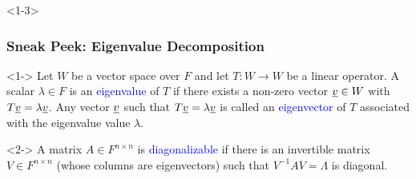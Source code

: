 \documentclass[10pt,english,aspectratio=169]{beamer}
\begin{document}
\begin{frame}<1-3> \frametitle{Sneak Peek: Eigenvalue Decomposition}

\begin{definition}<1->
Let $W$ be a vector space over $F$ and let $T\colon W \to W$ be a linear operator.
A scalar $\lambda \in F$ is an \textcolor{blue}{eigenvalue} of $T$ if there exists a non-zero vector $\underline{v} \in W$ with $T \underline{v} = \lambda \underline{v}$.
Any vector $\underline{v}$ such that $T \underline{v} = \lambda \underline{v}$ is called an \textcolor{blue}{eigenvector} of $T$ associated with the eigenvalue value $\lambda$.
\end{definition}

\begin{definition}<2->
A matrix $A \in F^{n \times n}$ is \textcolor{blue}{diagonalizable} if there is an invertible matrix $V \in F^{n \times n}$ (whose columns are eigenvectors) such that $V^{-1} A V = \Lambda$ is diagonal.
\end{definition}



\end{frame}
\end{document}
